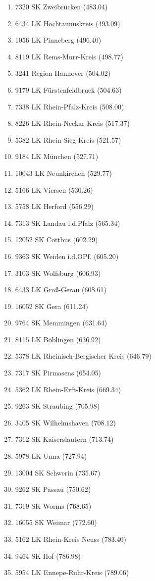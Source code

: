 \begin{enumerate}[itemsep=-6mm]
\item 7320 SK Zweibrücken (483.04)
\item 6434 LK Hochtaunuskreis (493.09)
\item 1056 LK Pinneberg (496.40)
\item 8119 LK Rems-Murr-Kreis (498.77)
\item 3241 Region Hannover (504.02)
\item 9179 LK Fürstenfeldbruck (504.63)
\item 7338 LK Rhein-Pfalz-Kreis (508.00)
\item 8226 LK Rhein-Neckar-Kreis (517.37)
\item 5382 LK Rhein-Sieg-Kreis (521.57)
\item 9184 LK München (527.71)
\item 10043 LK Neunkirchen (529.77)
\item 5166 LK Viersen (530.26)
\item 5758 LK Herford (556.29)
\item 7313 SK Landau i.d.Pfalz (565.34)
\item 12052 SK Cottbus (602.29)
\item 9363 SK Weiden i.d.OPf. (605.20)
\item 3103 SK Wolfsburg (606.93)
\item 6433 LK Groß-Gerau (608.61)
\item 16052 SK Gera (611.24)
\item 9764 SK Memmingen (631.64)
\item 8115 LK Böblingen (636.92)
\item 5378 LK Rheinisch-Bergischer Kreis (646.79)
\item 7317 SK Pirmasens (654.05)
\item 5362 LK Rhein-Erft-Kreis (669.34)
\item 9263 SK Straubing (705.98)
\item 3405 SK Wilhelmshaven (708.12)
\item 7312 SK Kaiserslautern (713.74)
\item 5978 LK Unna (727.94)
\item 13004 SK Schwerin (735.67)
\item 9262 SK Passau (750.62)
\item 7319 SK Worms (768.65)
\item 16055 SK Weimar (772.60)
\item 5162 LK Rhein-Kreis Neuss (783.40)
\item 9464 SK Hof (786.98)
\item 5954 LK Ennepe-Ruhr-Kreis (789.06)

\end{enumerate}
